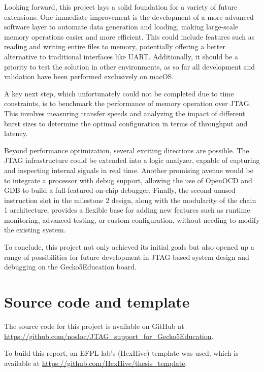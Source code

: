 \documentclass[a4paper,11pt,oneside]{report}
\newcommand{\boardName}{Gecko5Education \xspace}
\begin{document}
Looking forward, this project lays a solid foundation for a variety of future extensions.
One immediate improvement is the development of a more advanced software layer to automate data generation and loading, making large-scale memory operations easier and more efficient. 
This could include features such as reading and writing entire files to memory, potentially offering a better alternative to traditional interfaces like UART.
Additionally, it should be a priority to test the solution in other environments, as so far all development and validation have been performed exclusively on macOS.

A key next step, which unfortunately could not be completed due to time constraints, is to benchmark the performance of memory operation over JTAG. 
This involves measuring transfer speeds and analyzing the impact of different burst sizes to determine the optimal configuration in terms of throughput and latency.

Beyond performance optimization, several exciting directions are possible.
The JTAG infrastructure could be extended into a logic analyzer, capable of capturing and inspecting internal signals in real time.
Another promising avenue would be to integrate a processor with debug support, allowing the use of OpenOCD and GDB to build a full-featured on-chip debugger.
Finally, the second unused instruction slot in the milestone 2 design, along with the modularity of the chain 1 architecture, provides a flexible base for adding new features such as runtime monitoring, 
advanced testing, or custom configuration, without needing to modify the existing system.

To conclude, this project not only achieved its initial goals but also opened up a range of possibilities for future development in JTAG-based system design and debugging on the \boardName board.

\cleardoublepage
{}
{}
\printbibliography

\appendix
\chapter{Source code and template}

The source code for this project is available on GitHub at \url{https://github.com/nosloc/JTAG_support_for_Gecko5Education}.

To build this report, an EFPL lab's (HexHive) template was used, which is available at \url{https://github.com/HexHive/thesis_template}.
\end{document}
